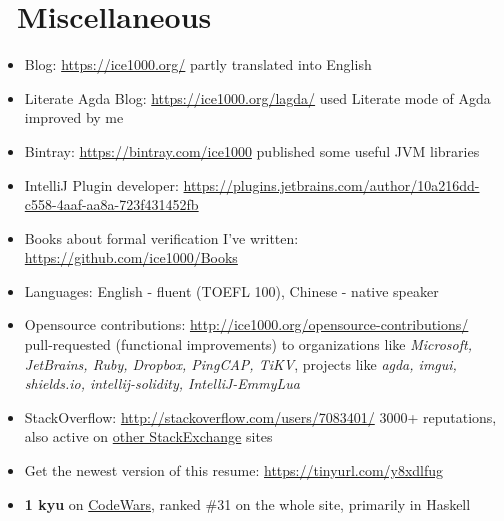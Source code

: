 \documentclass{resume}
\begin{document}
\section{\faInfo\ Miscellaneous}
\begin{itemize}[parsep=0.25ex]
  \item Blog: \url{https://ice1000.org/} partly translated into English
  \item Literate Agda Blog: \url{https://ice1000.org/lagda/} used Literate mode of Agda improved by me
  \item Bintray: \url{https://bintray.com/ice1000} published some useful JVM libraries
  \item IntelliJ Plugin developer: \url{https://plugins.jetbrains.com/author/10a216dd-c558-4aaf-aa8a-723f431452fb}
  \item Books about formal verification I've written: \url{https://github.com/ice1000/Books}
  \item Languages: English - fluent (TOEFL 100), Chinese - native speaker
  \item Opensource contributions: \url{http://ice1000.org/opensource-contributions/} \\
    pull-requested (functional improvements) to organizations like \textit{Microsoft, JetBrains, Ruby, Dropbox, PingCAP, TiKV},
    projects like \textit{agda, imgui, shields.io, intellij-solidity, IntelliJ-EmmyLua}
  \item StackOverflow: \url{http://stackoverflow.com/users/7083401/}
    3000+ reputations, also active on \href{https://stackexchange.com/users/9532102/} {other StackExchange} sites
  \item Get the newest version of this resume: \url{https://tinyurl.com/y8xdlfug}
  \item \textbf{1 kyu} on
    \href{https://www.codewars.com/users/ice1000} {CodeWars},
    ranked \#31 on the whole site, primarily in Haskell
\end{itemize}

%
%
\end{document}
